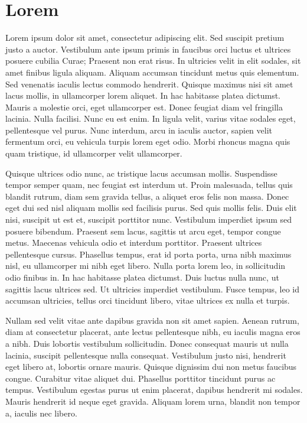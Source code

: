 

\chapter{Lorem}

Lorem ipsum dolor sit amet, consectetur adipiscing elit. Sed suscipit pretium justo a auctor. Vestibulum ante ipsum primis in faucibus orci luctus et ultrices posuere cubilia Curae; Praesent non erat risus. In ultricies velit in elit sodales, sit amet finibus ligula aliquam. Aliquam accumsan tincidunt metus quis elementum. Sed venenatis iaculis lectus commodo hendrerit. Quisque maximus nisi sit amet lacus mollis, in ullamcorper lorem aliquet. In hac habitasse platea dictumst. Mauris a molestie orci, eget ullamcorper est. Donec feugiat diam vel fringilla lacinia. Nulla facilisi. Nunc eu est enim. In ligula velit, varius vitae sodales eget, pellentesque vel purus. Nunc interdum, arcu in iaculis auctor, sapien velit fermentum orci, eu vehicula turpis lorem eget odio. Morbi rhoncus magna quis quam tristique, id ullamcorper velit ullamcorper.

Quisque ultrices odio nunc, ac tristique lacus accumsan mollis. Suspendisse tempor semper quam, nec feugiat est interdum ut. Proin malesuada, tellus quis blandit rutrum, diam sem gravida tellus, a aliquet eros felis non massa. Donec eget dui sed nisl aliquam mollis sed facilisis purus. Sed quis mollis felis. Duis elit nisi, suscipit ut est et, suscipit porttitor nunc. Vestibulum imperdiet ipsum sed posuere bibendum. Praesent sem lacus, sagittis ut arcu eget, tempor congue metus. Maecenas vehicula odio et interdum porttitor. Praesent ultrices pellentesque cursus. Phasellus tempus, erat id porta porta, urna nibh maximus nisl, eu ullamcorper mi nibh eget libero. Nulla porta lorem leo, in sollicitudin odio finibus in. In hac habitasse platea dictumst. Duis luctus nulla nunc, ut sagittis lacus ultrices sed. Ut ultricies imperdiet vestibulum. Fusce tempus, leo id accumsan ultricies, tellus orci tincidunt libero, vitae ultrices ex nulla et turpis.

Nullam sed velit vitae ante dapibus gravida non sit amet sapien. Aenean rutrum, diam at consectetur placerat, ante lectus pellentesque nibh, eu iaculis magna eros a nibh. Duis lobortis vestibulum sollicitudin. Donec consequat mauris ut nulla lacinia, suscipit pellentesque nulla consequat. Vestibulum justo nisi, hendrerit eget libero at, lobortis ornare mauris. Quisque dignissim dui non metus faucibus congue. Curabitur vitae aliquet dui. Phasellus porttitor tincidunt purus ac tempus. Vestibulum egestas purus ut enim placerat, dapibus hendrerit mi sodales. Mauris hendrerit id neque eget gravida. Aliquam lorem urna, blandit non tempor a, iaculis nec libero.

